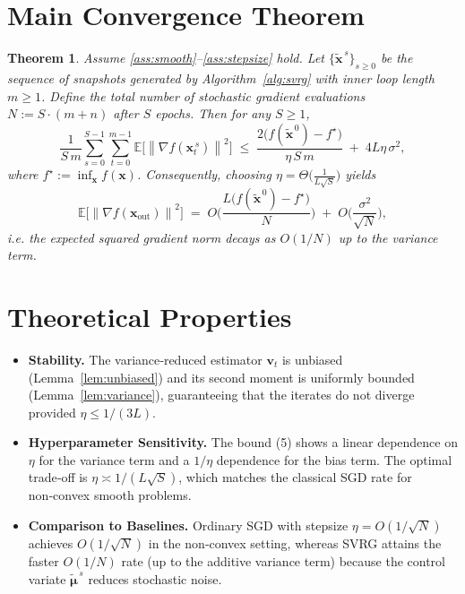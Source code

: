 \documentclass{article}
\newtheorem{theorem}{Theorem}[section]
\newcommand{\EE}{\mathbb{E}}
\newcommand{\norm}[1]{\left\|#1\right\|}
\newcommand{\grad}{\nabla}
\begin{document}
\section*{Main Convergence Theorem}
\begin{theorem}\label{thm:main}
Assume \ref{ass:smooth}–\ref{ass:stepsize} hold.  
Let $\{\tilde{\mathbf{x}}^{\,s}\}_{s\ge0}$ be the sequence of snapshots generated by
Algorithm~\ref{alg:svrg} with inner loop length $m\ge1$.
Define the total number of stochastic gradient evaluations
$N:=S\cdot(m+n)$ after $S$ epochs.
Then for any $S\ge1$,
\[
\frac{1}{S\,m}\sum_{s=0}^{S-1}\sum_{t=0}^{m-1}
\EE\!\big[\norm{\grad f(\mathbf{x}_{t}^{\,s})}^{2}\big]
\;\le\;
\frac{2\big(f(\tilde{\mathbf{x}}^{\,0})-f^{\star}\big)}{\eta\,S\,m}
\;+\;4L\eta\,\sigma^{2},
\tag{5}
\]
where $f^{\star}:=\inf_{\mathbf{x}}f(\mathbf{x})$.
Consequently, choosing $\eta= \Theta\!\big(\frac{1}{L\sqrt{S}}\big)$ yields
\[
\EE\!\big[\norm{\grad f(\mathbf{x}_{\mathrm{out}})}^{2}\big]
\;=\;O\!\Big(\frac{L\big(f(\tilde{\mathbf{x}}^{\,0})-f^{\star}\big)}{N}\Big)
\;+\;O\!\Big(\frac{\sigma^{2}}{\sqrt{N}}\Big),
\]
i.e. the expected squared gradient norm decays as $O(1/N)$ up to the
variance term.
\end{theorem}

\section*{Theoretical Properties}
\begin{itemize}[leftmargin=*]
\item \textbf{Stability.} The variance‑reduced estimator $\mathbf{v}_t$ is unbiased
      (Lemma~\ref{lem:unbiased}) and its second moment is uniformly bounded
      (Lemma~\ref{lem:variance}), guaranteeing that the iterates do not
      diverge provided $\eta\le 1/(3L)$.
\item \textbf{Hyperparameter Sensitivity.}
      The bound (5) shows a linear dependence on $\eta$ for the variance term
      and a $1/\eta$ dependence for the bias term.
      The optimal trade‑off is $\eta\asymp 1/(L\sqrt{S})$, which matches the
      classical SGD rate for non‑convex smooth problems.
\item \textbf{Comparison to Baselines.}
      Ordinary SGD with stepsize $\eta=O(1/\sqrt{N})$ achieves
      $O(1/\sqrt{N})$ in the non‑convex setting, whereas SVRG attains the
      faster $O(1/N)$ rate (up to the additive variance term) because the
      control variate $\tilde{\bm\mu}^{\,s}$ reduces stochastic noise.
\end{itemize}
\end{document}
